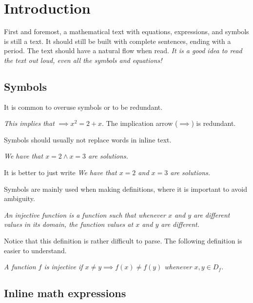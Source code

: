 

\section[mistakesIntro]{Introduction}

First and foremost, a mathematical text with equations, expressions, and
symbols is still a text.
It should still be built with complete sentences, ending with a period.
The text should have a natural flow when read.
\emph{It is a good idea to read the text out loud, even all the symbols and equations!}



\subsection[mistakesSymbols]{Symbols}

It is common to overuse symbols or to be redundant.
\begin{example}
\emph{This implies that}
$
\implies x^2=2+x.
$
The implication arrow ($\implies$) is redundant.
\end{example}

Symbols should usually not replace words in inline text.
\begin{example}
\emph{We have that $x=2 \wedge x=3$ are solutions.}

It is better to just write \emph{We have that $x=2$ and $x=3$ are solutions.}
\end{example}


Symbols are mainly used when making definitions, where it is important to
avoid ambiguity.
\begin{example}
\emph{An injective function is a function such that whenever $x$ and $y$ are
different values in its domain, the function values at $x$ and $y$ are
different.}

Notice that this definition is rather difficult to parse.
The following definition is easier to understand.

\emph{
A function $f$ is injective if $x\neq y \implies f(x) \neq f(y)$ whenever $x,y \in D_f$.
}

\end{example}

\subsection[mistakesSentenceStart]{Inline math expressions}

